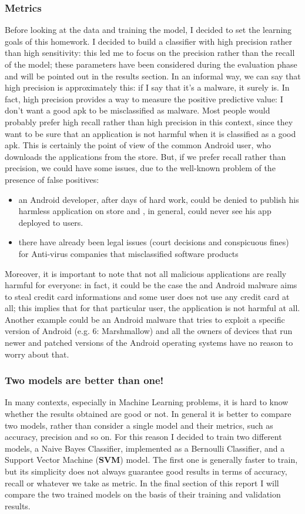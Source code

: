 \documentclass[12pt]{article}
\begin{document}
\subsubsection{Metrics}
Before looking at the data and training the model, I decided to set the learning goals of this homework. I decided to build a classifier with high precision rather than high sensitivity: this led me to focus on the precision rather than the recall of the model; these parameters have been considered during the evaluation phase and will be pointed out in the results section.
In an informal way, we can say that high precision is approximately this: if I say that it's a malware, it surely is. In fact, high precision provides a way to measure the positive predictive value: I don't want a good apk to be misclassified as malware.
Most people would probably prefer high recall rather than high precision in this context, since they want to be sure that an application is not harmful when it is classified as a good apk. This is certainly the point of view of the common Android user, who downloads the applications from the store. But, if we prefer recall rather than precision, we could have some issues, due to the well-known problem of the presence of false positives:
\begin{itemize}
\item an Android developer, after days of hard work, could be denied to publish his harmless application on store and , in general, could never see his app deployed to users.
\item there have already been legal issues (court decisions and conspicuous fines) for Anti-virus companies that misclassified software products
\end{itemize}
Moreover, it is important to note that not all malicious applications are really harmful for everyone: in fact, it could be the case the and Android malware aims to steal credit card informations and some user does not use any credit card at all; this implies that for that particular user, the application is not harmful at all. Another example could be an Android malware that tries to exploit a specific version of Android (e.g. 6: Marshmallow) and all the owners of devices that run newer and patched versions of the Android operating systems have no reason to worry about that.
\subsubsection{Two models are better than one!}
In many contexts, especially in Machine Learning problems, it is hard to know whether the results obtained are good or not. In general it is better to compare two models, rather than consider a single model and their metrics, such as accuracy, precision and so on.
For this reason I decided to train two different models, a Naive Bayes Classifier, implemented as a Bernoulli Classifier, and a Support Vector Machine (\textbf{SVM}) model. The first one is generally faster to train, but its simplicity does not always guarantee good results in terms of accuracy, recall or whatever we take as metric.
In the final section of this report I will compare the two trained models on the basis of their training and validation results. 
\end{document}
